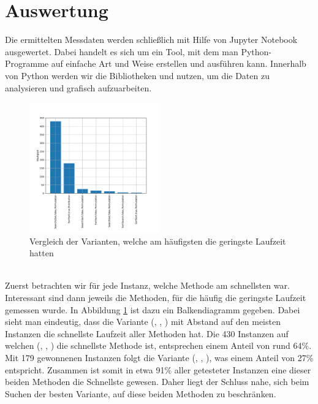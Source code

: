 
\section{Auswertung}
\label{ref:auswertung}
Die ermittelten Messdaten werden schließlich mit Hilfe von 
Jupyter Notebook \cite{jupyter} ausgewertet. Dabei
handelt es sich um ein Tool, mit dem man Python-Programme auf einfache Art und Weise erstellen und 
ausführen kann.
Innerhalb von Python werden wir die Bibliotheken  und  nutzen, um die Daten
zu analysieren und grafisch aufzuarbeiten.
\begin{figure}
\centering
	\includegraphics[width = 0.5\textwidth]{figures/counting.pdf}
	\caption{Vergleich der Varianten, welche am häufigsten die geringste Laufzeit hatten}
	\label{fig:messung_counting}
\end{figure}
\\

Zuerst betrachten wir für jede Instanz, welche Methode am schnellsten war.
Interessant sind dann jeweils die Methoden, für die häufig die geringste Laufzeit gemessen wurde.
In Abbildung \ref{fig:messung_counting} ist dazu ein Balkendiagramm gegeben.
Dabei sieht man eindeutig, dass die Variante (\SeaUSet, \false, \perm) mit Abstand 
auf den meisten Instanzen die schnellste Laufzeit aller Methoden hat. Die
430 Instanzen auf welchen (\SeaUSet, \false, \perm) die schnellste Methode ist, entsprechen einem Anteil von rund
64\%. Mit 179 \glqq gewonnenen\grqq{} Instanzen folgt die Variante (\SorSor, \true, \distr), was einem Anteil von
27\% entspricht. Zusammen ist somit in etwa 91\% aller getesteter Instanzen eine dieser beiden Methoden
die Schnellste gewesen. Daher liegt der Schluss nahe, sich beim Suchen der \glqq besten\grqq{} Variante,
auf diese beiden Methoden zu beschränken. 
\\

